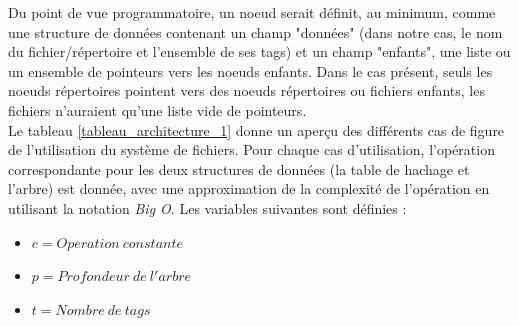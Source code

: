 \documentclass[a4paper, 12pt]{article}
\begin{document}
Du point de vue programmatoire, un noeud serait définit, au minimum, comme une structure de données 
contenant un champ "données" (dans notre cas, le nom du fichier/répertoire et l'ensemble de ses tags) 
et un champ "enfants", une liste ou un ensemble de pointeurs vers les noeuds enfants. Dans le cas 
présent, seuls les noeuds répertoires pointent vers des noeuds répertoires ou fichiers enfants, 
les fichiers n'auraient qu'une liste vide de pointeurs.
\\
Le tableau \ref{tableau_architecture_1} donne un aperçu des différents cas de figure de l'utilisation du système 
de fichiers. Pour chaque cas d'utilisation, l'opération correspondante pour les deux structures de 
données (la table de hachage et l'arbre) est donnée, avec une approximation de la complexité de 
l'opération en utilisant la notation \textit{Big O}. Les variables suivantes sont définies :
\begin{itemize}
    \item $c = Operation \ constante$
    \item $p = Profondeur \ de \ l'arbre$
    \item $t = Nombre \ de \ tags$
\end{itemize}
\end{document}
